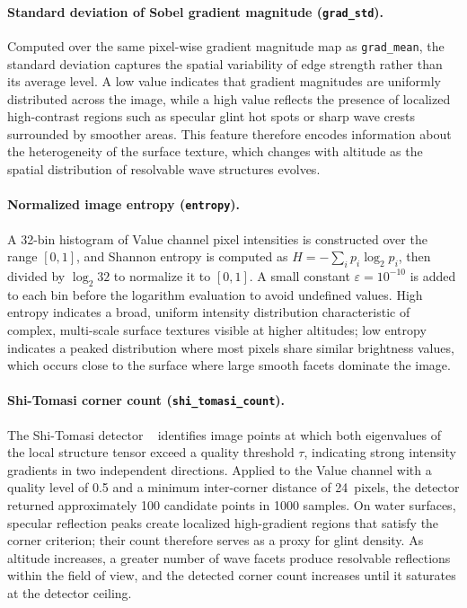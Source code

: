 \paragraph{Standard deviation of Sobel gradient magnitude (\texttt{grad\_std}).}
Computed over the same pixel-wise gradient magnitude map as \texttt{grad\_mean}, the standard deviation captures the spatial variability of edge strength rather than its average level. A low value indicates that gradient magnitudes are uniformly distributed across the image, while a high value reflects the presence of localized high-contrast regions such as specular glint hot spots or sharp wave crests surrounded by smoother areas. This feature therefore encodes information about the heterogeneity of the surface texture, which changes with altitude as the spatial distribution of resolvable wave structures evolves.

\paragraph{Normalized image entropy (\texttt{entropy}).} 
A 32-bin histogram of Value channel pixel intensities is constructed over the range $[0, 1]$, and Shannon entropy is computed as $H = -\sum_i p_i \log_2 p_i$, then divided by $\log_2 32$ to normalize it to $[0, 1]$. A small constant $\varepsilon = 10^{-10}$ is added to each bin before the logarithm evaluation to avoid undefined values. High entropy indicates a broad, uniform intensity distribution characteristic of complex, multi-scale surface textures visible at higher altitudes; low entropy indicates a peaked distribution where most pixels share similar brightness values, which occurs close to the surface where large smooth facets dominate the image.

\paragraph{Shi-Tomasi corner count (\texttt{shi\_tomasi\_count}).}
The Shi-Tomasi detector ~\cite{ShiTomasi1994} identifies image points at which both eigenvalues of the local structure tensor exceed a quality threshold $\tau$, indicating strong intensity gradients in two independent directions. Applied to the Value channel with a quality level of 0.5 and a minimum inter-corner distance of 24~pixels, the detector returned approximately 100 candidate points in 1000 samples. On water surfaces, specular reflection peaks create localized high-gradient regions that satisfy the corner criterion; their count therefore serves as a proxy for glint density. As altitude increases, a greater number of wave facets produce resolvable reflections within the field of view, and the detected corner count increases until it saturates at the detector ceiling.

